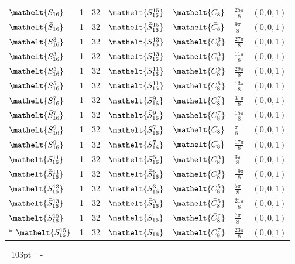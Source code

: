 \documentclass[10pt,a4paper]{article}
\newcommand{\needspace}[1]{\par\penalty-100\begingroup\dimen0=#1\relax\dimen2=\pagegoal
  \advance\dimen2-\pagetotal\ifdim\dimen0>\dimen2\relax\ifdim\dimen2>0pt\vfil\break\fi\fi
  \endgroup}
\numberwithin{equation}{section}
\newcommand{\eltfont}[1]{{\let\sigma\eltsigma\mathelt{#1}}}
\newcommand{\cls}[1]{\eltfont{#1}}
\newcommand{\dirvec}[3]{(#1, #2, #3)}
\newcommand{\barred}[1]{\bar{#1}}
\begin{document}
{\begin{longtable}{@{}lrrllll@{}}
$\cls{S_{16}}$ & 1 & 32 & $\cls{S_{16}^{15}}$ & $\cls{\barred{C}_{8}}$ & $\tfrac{25\pi}{8}$ & $\dirvec{0}{0}{1}$\\
$\cls{\barred{S}_{16}}$ & 1 & 32 & $\cls{\barred{S}_{16}^{15}}$ & $\cls{\barred{C}_{8}}$ & $\tfrac{9\pi}{8}$ & $\dirvec{0}{0}{1}$\\
$\cls{S_{16}^{3}}$ & 1 & 32 & $\cls{S_{16}^{13}}$ & $\cls{\barred{C}_{8}^{3}}$ & $\tfrac{27\pi}{8}$ & $\dirvec{0}{0}{1}$\\
$\cls{\barred{S}_{16}^{3}}$ & 1 & 32 & $\cls{\barred{S}_{16}^{13}}$ & $\cls{\barred{C}_{8}^{3}}$ & $\tfrac{11\pi}{8}$ & $\dirvec{0}{0}{1}$\\
$\cls{S_{16}^{5}}$ & 1 & 32 & $\cls{S_{16}^{11}}$ & $\cls{C_{8}^{5}}$ & $\tfrac{29\pi}{8}$ & $\dirvec{0}{0}{1}$\\
$\cls{\barred{S}_{16}^{5}}$ & 1 & 32 & $\cls{\barred{S}_{16}^{11}}$ & $\cls{C_{8}^{5}}$ & $\tfrac{13\pi}{8}$ & $\dirvec{0}{0}{1}$\\
$\cls{S_{16}^{7}}$ & 1 & 32 & $\cls{S_{16}^{9}}$ & $\cls{C_{8}^{7}}$ & $\tfrac{31\pi}{8}$ & $\dirvec{0}{0}{1}$\\
$\cls{\barred{S}_{16}^{7}}$ & 1 & 32 & $\cls{\barred{S}_{16}^{9}}$ & $\cls{C_{8}^{7}}$ & $\tfrac{15\pi}{8}$ & $\dirvec{0}{0}{1}$\\
$\cls{S_{16}^{9}}$ & 1 & 32 & $\cls{S_{16}^{7}}$ & $\cls{C_{8}}$ & $\tfrac{\pi}{8}$ & $\dirvec{0}{0}{1}$\\
$\cls{\barred{S}_{16}^{9}}$ & 1 & 32 & $\cls{\barred{S}_{16}^{7}}$ & $\cls{C_{8}}$ & $\tfrac{17\pi}{8}$ & $\dirvec{0}{0}{1}$\\
$\cls{S_{16}^{11}}$ & 1 & 32 & $\cls{S_{16}^{5}}$ & $\cls{C_{8}^{3}}$ & $\tfrac{3\pi}{8}$ & $\dirvec{0}{0}{1}$\\
$\cls{\barred{S}_{16}^{11}}$ & 1 & 32 & $\cls{\barred{S}_{16}^{5}}$ & $\cls{C_{8}^{3}}$ & $\tfrac{19\pi}{8}$ & $\dirvec{0}{0}{1}$\\
$\cls{S_{16}^{13}}$ & 1 & 32 & $\cls{S_{16}^{3}}$ & $\cls{\barred{C}_{8}^{5}}$ & $\tfrac{5\pi}{8}$ & $\dirvec{0}{0}{1}$\\
$\cls{\barred{S}_{16}^{13}}$ & 1 & 32 & $\cls{\barred{S}_{16}^{3}}$ & $\cls{\barred{C}_{8}^{5}}$ & $\tfrac{21\pi}{8}$ & $\dirvec{0}{0}{1}$\\
$\cls{S_{16}^{15}}$ & 1 & 32 & $\cls{S_{16}}$ & $\cls{\barred{C}_{8}^{7}}$ & $\tfrac{7\pi}{8}$ & $\dirvec{0}{0}{1}$\\*
$\cls{\barred{S}_{16}^{15}}$ & 1 & 32 & $\cls{\barred{S}_{16}}$ & $\cls{\barred{C}_{8}^{7}}$ & $\tfrac{23\pi}{8}$ & $\dirvec{0}{0}{1}$\\
\bottomrule\end{longtable}}
\needspace{103pt}
\end{document}
